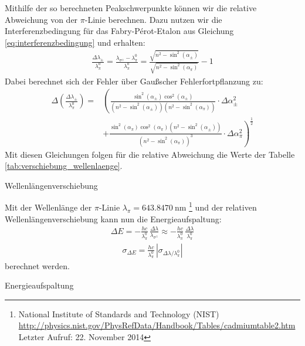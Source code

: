 \documentclass[11pt, a4paper]{article}
\begin{document}
Mithilfe der so berechneten Peakschwerpunkte können wir die relative Abweichung von der $\pi$-Linie berechnen.
Dazu nutzen wir die Interferenzbedingung für das Fabry-Pérot-Etalon aus Gleichung \ref{eq:interferenzbedingung} und erhalten:
\begin{align}
	\frac{\Delta \lambda_\pm}{\lambda_\pi^0} = \frac{\lambda_{\sigma^\pm} - \lambda_\pi^0}{\lambda_\pi^0} = \frac{\sqrt{n^2 - \sin^2(\alpha_{\pm})}}{\sqrt{n^2 - \sin^2(\alpha_\pi)}} - 1
\end{align}
Dabei berechnet sich der  Fehler über Gaußscher Fehlerfortpflanzung zu:
\begin{align}
	\Delta \left( \frac{\Delta \lambda_\pm}{\lambda_\pi^0} \right) = & \left( \frac{\sin^2(\alpha_\pm) \cos^2(\alpha_\pm)}{(n^2-\sin^2(\alpha_\pm))(n^2-\sin^2(\alpha_\pi))} \cdot \Delta \alpha_\pm^2 \right. \nonumber\\
	& \left. + \frac{\sin^2(\alpha_\pi) \cos^2(\alpha_\pi) (n^2 - \sin^2(\alpha_\pm))}{(n^2-\sin^2(\alpha_\pi))^3} \cdot \Delta \alpha_\pi^2\right)^\frac{1}{2}
\end{align}
Mit diesen Gleichungen folgen für die relative Abweichung die Werte der Tabelle \ref{tab:verschiebung_wellenlaenge}. 
\begin{table}[h]
	\centering
	
	\caption{Wellenlängenverschiebung}
	\label{tab:verschiebung_wellenlaenge}
\end{table}

Mit der Wellenlänge der $\pi$-Linie $\lambda_\pi = \SI{643,8470}{\nano\metre}$ \footnote{National Institute of Standards and Technology (NIST)\\ \url{http://physics.nist.gov/PhysRefData/Handbook/Tables/cadmiumtable2.htm}\\Letzter Aufruf: 22. November 2014} und der relativen Wellenlängenverschiebung kann nun die Energieaufspaltung:
\begin{align}
	\Delta E = -\frac{h c}{\lambda_\pi^0}\,\frac{\Delta \lambda}{\lambda_{\sigma^\pm}} \approx -\frac{h c}{\lambda_\pi^0}\,\frac{\Delta \lambda}{\lambda_\pi^0}
\end{align}
\begin{align}
	\sigma_{\Delta E} = \frac{h c}{\lambda_\pi^0} \, | \sigma_{\Delta \lambda / \lambda_\pi^0} |
\end{align}
berechnet werden.
\begin{table}[h]
	\centering
	
	\caption{Energieaufspaltung}
	\label{tab:energieaufspaltung}
\end{table}
\end{document}
